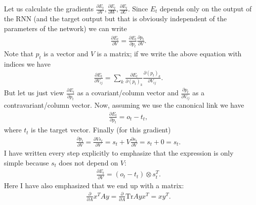 \documentclass[12pt]{article}
\numberwithin{equation}{section}
\begin{document}
Let us calculate the gradients \(\frac{\partial E_t}{\partial V}, \frac{\partial E_t}{\partial W}, \frac{\partial E_t}{\partial U}\). Since \(E_t\) depends only on the output of the RNN (and the target output but that is obviously independent of the parameters of the network) we can write
\begin{align}
\frac{\partial E_t}{\partial V} = \frac{\partial E_t}{\partial p_t} \frac{\partial p_t}{\partial V}.
\end{align}
Note that \(p_t\) is a vector and \(V\) is a matrix; if we write the above equation with indices we have
\begin{align}
\frac{\partial E_t}{\partial V_{ij}} =\sum_k \frac{\partial E_t}{\partial (p_t)_k} \frac{\partial (p_t)_k}{\partial V_{ij}}.
\end{align}
But let us just view \(\frac{\partial E_t}{\partial p_t}\) as a covariant/column vector and \(\frac{\partial p_t}{\partial V_{ij}}\) as a contravariant/column vector. Now, assuming we use the canonical link we have
\begin{align}
\frac{\partial E_t}{\partial p_t} = o_t - t_t,
\end{align}
where \(t_t\) is the target vector. Finally (for this gradient)
\begin{align}
\frac{\partial p_t}{\partial V} = \frac{\partial Vs_t}{\partial V} = s_t + V \frac{\partial s_t}{\partial V} = s_t + 0 = s_t. 
\end{align}
I have written every step explicitly to emphasize that the expression is only simple because \(s_t\) does not depend on \(V\):
\begin{align}
\frac{\partial E_t}{\partial V} = (o_t - t_t)\otimes s_t^T.
\end{align}
Here I have also emphasized that we end up with a matrix:
\begin{align}
\frac{\partial }{\partial A}x^TAy = \frac{\partial }{\partial A} \mathrm{Tr}Ayx^T = xy^T.
\end{align}
\end{document}

